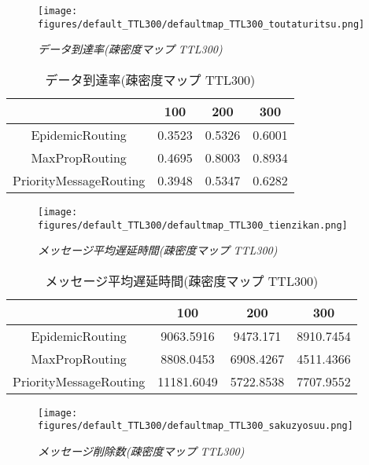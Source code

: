 \documentclass[11pt]{icsthesis}
\begin{document}
\begin{figure}[h]
\centering
\texttt{[image: figures/default\_TTL300/defaultmap\_TTL300\_toutaturitsu.png]}
\caption[]{\it{データ到達率(疎密度マップ TTL300)}}
\label{somituttl300deliveryprobgraph}
\end{figure}

\begin{table}[H]
 \begin{center}
      \caption[]{データ到達率(疎密度マップ TTL300)}
      \label{somituTtl300deliveryprob}
      \begin{tabular}{|c|c|c|c|}
\hline
&100&200&300\\
\hline
EpidemicRouting&0.3523&0.5326&0.6001\\
\hline
MaxPropRouting&0.4695&0.8003&0.8934\\
\hline
PriorityMessageRouting&0.3948&0.5347&0.6282\\
\hline
      \end{tabular}
    \end{center}
\end{table}

\newpage

\begin{figure}[h]
\centering
\texttt{[image: figures/default\_TTL300/defaultmap\_TTL300\_tienzikan.png]}
\caption[]{\it{メッセージ平均遅延時間(疎密度マップ TTL300)}}
\label{somituttl300latencyavggraph}
\end{figure}

\begin{table}[H]
 \begin{center}
      \caption[]{メッセージ平均遅延時間(疎密度マップ TTL300)}
      \label{somituTtl300latencyavg}
      \begin{tabular}{|c|c|c|c|}
\hline
&100&200&300\\
\hline
EpidemicRouting&9063.5916&9473.171&8910.7454\\
\hline
MaxPropRouting&8808.0453&6908.4267&4511.4366\\
\hline
PriorityMessageRouting&11181.6049&5722.8538&7707.9552\\
\hline
      \end{tabular}
    \end{center}
\end{table}

\begin{figure}[h]
\centering
\texttt{[image: figures/default\_TTL300/defaultmap\_TTL300\_sakuzyosuu.png]}
\caption[]{\it{メッセージ削除数(疎密度マップ TTL300)}}
\label{somituttl300droppedgraph}
\end{figure}
\end{document}
